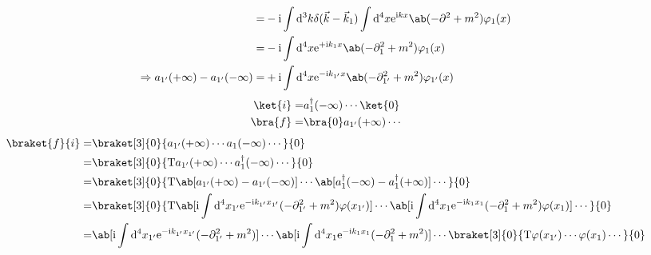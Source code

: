 \documentclass{article}
\newcommand{\rme}{\mathrm{e}}
\newcommand{\rmi}{\mathrm{i}}
\newcommand{\rmT}{\mathrm{T}}
\newcommand{\veck}{\vec{k}}
\begin{document}
\begin{align*}
    =                                                   & - \rmi \int \odif[order=3]{k} \delta(\veck - \veck_1) \int \odif[order=4]{x} \rme^{\rmi k x} \ab(- \partial^2 + m^2) \varphi_1(x)                                                          \\
    =                                                   & - \rmi \int \odif[order=4]{x} \rme^{+ \rmi k_1 x} \ab(- \partial_1^2 + m^2) \varphi_1(x)                                                                                                   \\
    \Rightarrow a_{1'}(+ \infty) - a_{1'}(- \infty) =   & + \rmi \int \odif[order=4]{x} \rme^{- \rmi k_{1'} x} \ab(- \partial_{1'}^2 + m^2) \varphi_{1'}(x)
\end{align*}
\begin{align*}
    \ket{i} = & a_1^{\dagger}(- \infty) \cdots \ket{0} \\
    \bra{f} = & \bra{0} a_{1'}(+ \infty) \cdots
\end{align*}
\begin{align*}
    \braket{f}{i} = & \braket[3]{0}{a_{1'}(+ \infty) \cdots a_1(- \infty) \cdots}{0}                                                                                                                                                                                              \\
    =               & \braket[3]{0}{\rmT a_{1'}(+ \infty) \cdots a_1^{\dagger}(- \infty) \cdots}{0}                                                                                                                                                                               \\
    =               & \braket[3]{0}{\rmT \ab[a_{1'}(+ \infty) - a_{1'}(- \infty)] \cdots \ab[a_1^{\dagger}(- \infty) - a_1^{\dagger}(+ \infty)] \cdots}{0}                                                                                                                        \\
    =               & \braket[3]{0}{\rmT \ab[\rmi \int \odif[order=4]{x_{1'}} \rme^{- \rmi k_{1'} x_{1'}} (- \partial_{1'}^2 + m^2) \varphi(x_{1'})] \cdots \ab[\rmi \int \odif[order=4]{x_1} \rme^{- \rmi k_1 x_1} (- \partial_1^2 + m^2) \varphi(x_1)] \cdots}{0}               \\
    =               & \ab[\rmi \int \odif[order=4]{x_{1'}} \rme^{- \rmi k_{1'} x_{1'}} (- \partial_{1'}^2 + m^2)] \cdots \ab[\rmi \int \odif[order=4]{x_1} \rme^{- \rmi k_1 x_1} (- \partial_1^2 + m^2)] \cdots \braket[3]{0}{\rmT \varphi(x_{1'}) \cdots \varphi(x_1) \cdots}{0} \\
\end{align*}
\end{document}
